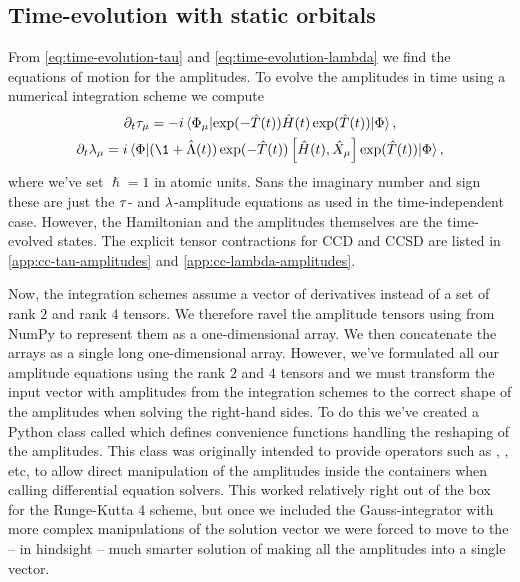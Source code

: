         \subsection{Time-evolution with static orbitals}
            \label{subsec:tdcc-implementation}
            From \autoref{eq:time-evolution-tau} and
            \autoref{eq:time-evolution-lambda} we find the equations of motion
            for the amplitudes.
            To evolve the amplitudes in time using a numerical integration
            scheme we compute
            \begin{gather}
                \partial_t \clustamp_{\mu}
                = -i\mel*{\slat_{\mu}}{
                    \exponential(-\clust(t))
                    \hamil(t)
                    \exponential(\clust(t))
                }{\slat},
                \\
                \partial_t \clustlamp_{\mu}
                = i\mel*{\slat}{
                    (\1 + \clustl(t))
                    \exponential(-\clust(t))
                    \com{\hamil(t)}{\hat{X}_{\mu}}
                    \exponential(\clust(t))
                }{\slat},
            \end{gather}
            where we've set $\hslash = 1$ in atomic units.
            Sans the imaginary number and sign these are just the $\tau$-
            and $\lambda$-amplitude equations as used in the time-independent
            case.
            However, the Hamiltonian and the amplitudes themselves are the
            time-evolved states.
            The explicit tensor contractions for CCD and CCSD are listed in
            \autoref{app:cc-tau-amplitudes} and
            \autoref{app:cc-lambda-amplitudes}.

            Now, the integration schemes assume a vector of derivatives instead
            of a set of rank $2$ and rank $4$ tensors.
            We therefore ravel the amplitude tensors using  from
            NumPy to represent them as a one-dimensional array.
            We then concatenate the arrays as a single long one-dimensional
            array.
            However, we've formulated all our amplitude equations using the rank
            $2$ and $4$ tensors and we must transform the input vector with
            amplitudes from the integration schemes to the correct shape of the
            amplitudes when solving the right-hand sides.
            To do this we've created a Python class called
             which defines convenience functions
            handling the reshaping of the amplitudes.
            This class was originally intended to provide operators such as
            , , etc, to allow direct manipulation of
            the amplitudes inside the containers when calling differential
            equation solvers.
            This worked relatively right out of the box for the Runge-Kutta 4
            scheme, but once we included the Gauss-integrator with more complex
            manipulations of the solution vector we were forced to move to the
            -- in hindsight -- much smarter solution of making all the
            amplitudes into a single vector.

